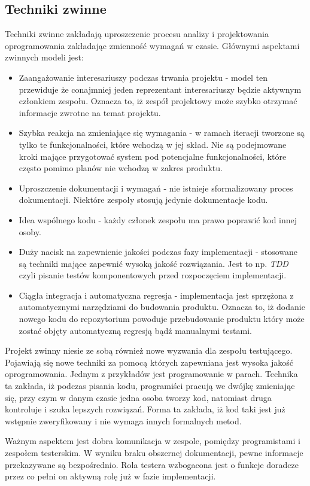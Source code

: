 \subsection{Techniki zwinne}
Techniki zwinne zakładają uproszczenie procesu analizy i projektowania oprogramowania zakładając zmienność wymagań w czasie. Głównymi aspektami zwinnych modeli jest:
\begin{itemize}
  \item Zaangażowanie interesariuszy podczas trwania projektu - model ten przewiduje że conajmniej jeden reprezentant interesariuszy będzie aktywnym członkiem zespołu. Oznacza to, iż zespół projektowy może szybko otrzymać informacje zwrotne na temat projektu.
  \item Szybka reakcja na zmieniające się wymagania - w ramach iteracji tworzone są tylko te funkcjonalności, które wchodzą w jej skład. Nie są podejmowane kroki mające przygotować system pod potencjalne funkcjonalności, które często pomimo planów nie wchodzą w zakres produktu. 
  \item Uproszczenie dokumentacji i wymagań - nie istnieje sformalizowany proces dokumentacji. Niektóre zespoły stosują jedynie dokumentacje kodu.
  \item Idea wspólnego kodu - każdy członek zespołu ma prawo poprawić kod innej osoby.
  \item Duży nacisk na zapewnienie jakości podczas fazy implementacji - stosowane są techniki mające zapewnić wysoką jakość rozwiązania. Jest to np. \textit{TDD} czyli pisanie testów komponentowych przed rozpoczęciem implementacji.
  \item Ciągła integracja i automatyczna regresja - implementacja jest sprzężona z automatycznymi narzędziami do budowania produktu. Oznacza to, iż dodanie nowego kodu do repozytorium powoduje przebudowanie produktu który może zostać objęty automatyczną regresją bądź manualnymi testami.
\end{itemize}
Projekt zwinny niesie ze sobą również nowe wyzwania dla zespołu testującego. Pojawiają się nowe techniki za pomocą których zapewniana jest wysoka jakość oprogramowania. Jednym z przykładów jest programowanie w parach. Technika ta zakłada, iż podczas pisania kodu, programiści pracują we dwójkę zmieniając się, przy czym w danym czasie jedna osoba tworzy kod, natomiast druga kontroluje i szuka lepszych rozwiązań. Forma ta zakłada, iż kod taki jest już wstępnie zweryfikowany i nie wymaga innych formalnych metod. 

Ważnym aspektem jest dobra komunikacja w zespole, pomiędzy programistami i zespołem testerskim. W wyniku braku obszernej dokumentacji, pewne informacje przekazywane są bezpośrednio. Rola testera wzbogacona jest o funkcje doradcze przez co pełni on aktywną rolę już w fazie implementacji.

